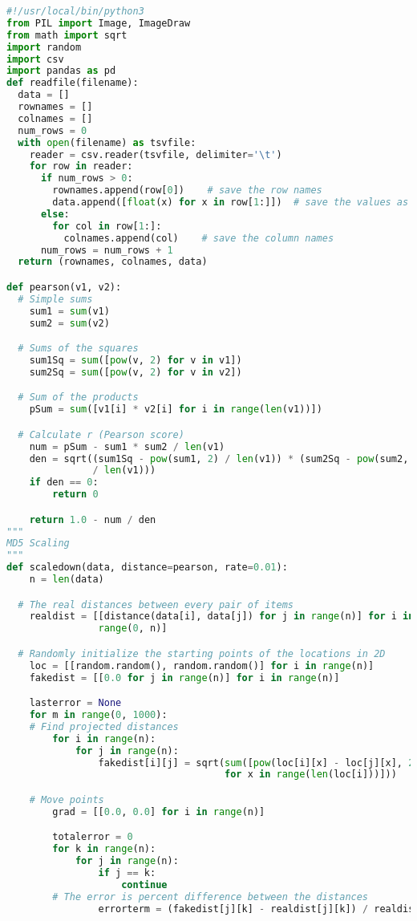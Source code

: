 \documentclass[12pt]{article}
\begin{document}
\begin{lstlisting}[language=Python, caption=three.py , label=2nd:copy]
#!/usr/local/bin/python3
from PIL import Image, ImageDraw
from math import sqrt
import random
import csv
import pandas as pd
def readfile(filename):
  data = []
  rownames = []
  colnames = []
  num_rows = 0
  with open(filename) as tsvfile:
    reader = csv.reader(tsvfile, delimiter='\t')
    for row in reader:
      if num_rows > 0:
        rownames.append(row[0])    # save the row names
        data.append([float(x) for x in row[1:]])  # save the values as floats
      else:
        for col in row[1:]:
          colnames.append(col)    # save the column names
      num_rows = num_rows + 1
  return (rownames, colnames, data)

def pearson(v1, v2):
  # Simple sums
    sum1 = sum(v1)
    sum2 = sum(v2)

  # Sums of the squares
    sum1Sq = sum([pow(v, 2) for v in v1])
    sum2Sq = sum([pow(v, 2) for v in v2])

  # Sum of the products
    pSum = sum([v1[i] * v2[i] for i in range(len(v1))])

  # Calculate r (Pearson score)
    num = pSum - sum1 * sum2 / len(v1)
    den = sqrt((sum1Sq - pow(sum1, 2) / len(v1)) * (sum2Sq - pow(sum2, 2)
               / len(v1)))
    if den == 0:
        return 0

    return 1.0 - num / den        
"""
MD5 Scaling
"""
def scaledown(data, distance=pearson, rate=0.01):
    n = len(data)

  # The real distances between every pair of items
    realdist = [[distance(data[i], data[j]) for j in range(n)] for i in
                range(0, n)]

  # Randomly initialize the starting points of the locations in 2D
    loc = [[random.random(), random.random()] for i in range(n)]
    fakedist = [[0.0 for j in range(n)] for i in range(n)]

    lasterror = None
    for m in range(0, 1000):
    # Find projected distances
        for i in range(n):
            for j in range(n):
                fakedist[i][j] = sqrt(sum([pow(loc[i][x] - loc[j][x], 2)
                                      for x in range(len(loc[i]))]))

    # Move points
        grad = [[0.0, 0.0] for i in range(n)]

        totalerror = 0
        for k in range(n):
            for j in range(n):
                if j == k:
                    continue
        # The error is percent difference between the distances
                errorterm = (fakedist[j][k] - realdist[j][k]) / realdist[j][k]


\end{lstlisting}
\end{document}
